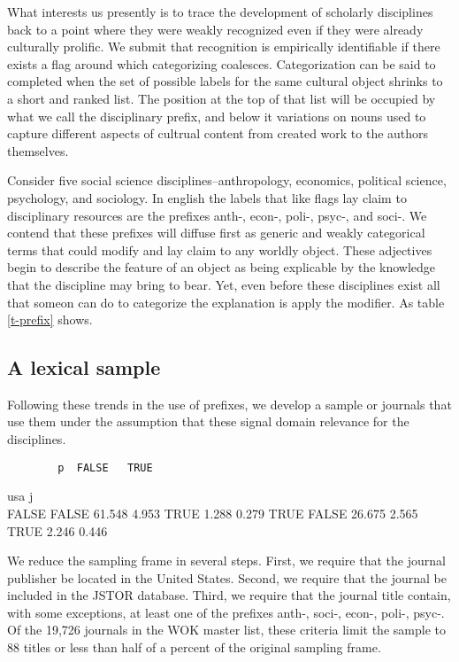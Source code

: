 \documentclass[]{article}
\begin{document}
What interests us presently is to trace the development of scholarly
disciplines back to a point where they were weakly recognized even if
they were already culturally prolific. We submit that recognition is
empirically identifiable if there exists a flag around which
categorizing coalesces. Categorization can be said to completed when the
set of possible labels for the same cultural object shrinks to a short
and ranked list. The position at the top of that list will be occupied
by what we call the disciplinary prefix, and below it variations on
nouns used to capture different aspects of cultrual content from created
work to the authors themselves.

Consider five social science disciplines--anthropology, economics,
political science, psychology, and sociology. In english the labels that
like flags lay claim to disciplinary resources are the prefixes anth-,
econ-, poli-, psyc-, and soci-. We contend that these prefixes will
diffuse first as generic and weakly categorical terms that could modify
and lay claim to any worldly object. These adjectives begin to describe
the feature of an object as being explicable by the knowledge that the
discipline may bring to bear. Yet, even before these disciplines exist
all that someon can do to categorize the explanation is apply the
modifier. As table \ref{t-prefix} shows.

\subsection{A lexical sample}\label{a-lexical-sample}

Following these trends in the use of prefixes, we develop a sample or
journals that use them under the assumption that these signal domain
relevance for the disciplines.

\begin{verbatim}
        p  FALSE   TRUE
\end{verbatim}

usa j\\
FALSE FALSE 61.548 4.953 TRUE 1.288 0.279 TRUE FALSE 26.675 2.565 TRUE
2.246 0.446

We reduce the sampling frame in several steps. First, we require that
the journal publisher be located in the United States. Second, we
require that the journal be included in the JSTOR database. Third, we
require that the journal title contain, with some exceptions, at least
one of the prefixes anth-, soci-, econ-, poli-, psyc-. Of the 19,726
journals in the WOK master list, these criteria limit the sample to 88
titles or less than half of a percent of the original sampling frame.
\end{document}
